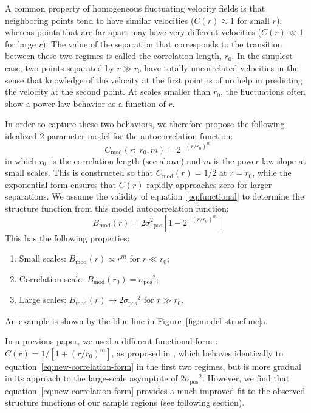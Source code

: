 \documentclass[fleqn,usenatbib, useAMS, a4paper]{mnras}
\newcommand\pos{\ensuremath{_{\mathrm{pos}}}}
\newcommand\model{\ensuremath{_{\mathrm{mod}}}}
\begin{document}
A common property of homogeneous fluctuating velocity fields is that neighboring points tend to have similar velocities
(\(C(r) \approx 1\) for small \(r\)),
whereas points that are far apart may have very different velocities
(\(C(r) \ll 1\) for large \(r\)).
The value of the separation that corresponds to
the transition between these two regimes
is called the correlation length, \(r_0\).
In the simplest case,
two points separated by \(r \gg r_0\) have totally uncorrelated velocities
in the sense that knowledge of the velocity at the first point is of
no help in predicting the velocity at the second point.
At scales smaller than \(r_0\), the fluctuations often show a power-law behavior
as a function of \(r\).

In order to capture these two behaviors,
we therefore propose the following idealized 2-parameter model
for the autocorrelation function:
%
\begin{equation}\label{eq:new-correlation-form}
  C\model(r;\ r_0, m) = 2^{- \left( r/r_0 \right)^m} 
\end{equation}
%
in which \(r_{0}\)\ is the correlation length (see above)
and \(m\) is the power-law slope at small scales.
This is constructed so that \(C\model(r) = 1/2\) at \(r = r_0\),
while the exponential form ensures that \(C(r)\) rapidly approaches zero
for larger separations.
We assume the validity of equation~\eqref{eq:functional} to determine the structure function
from this model autocorrelation function:
\begin{equation}
  \label{eq:model-strucfunc-ideal}
  B\model(r) = 2\sigma^2\pos \left[
    1 - 2^{- \left( r/r_0 \right)^m} 
  \right]
\end{equation}
This has the following properties:
\begin{enumerate}[1.]
 \item Small scales: \(B\model(r) \propto r^m\) for \(r \ll r_0\);
 \item Correlation scale: \(B\model(r_0) = \sigma\pos^2\);
 \item Large scales: \(B\model(r) \to 2 \sigma\pos^2\) for \(r \gg r_0\).
 \end{enumerate}
An example is shown by the blue line in Figure~\ref{fig:model-strucfunc}a.
 
In a previous paper, we used a different functional form
\citetext{See Fig.~13 of \citealp{arthur2016turbulence}}:
\(C(r) = 1/[1+(r/r_{0})^{m}]\), as proposed in \citet{1984ApJ...277..556S},
which behaves identically to equation~\eqref{eq:new-correlation-form}
in the first two regimes, but is more gradual in its approach
to the large-scale asymptote of \(2 \sigma\pos^2\).
However, we find that equation~\eqref{eq:new-correlation-form}
provides a much improved fit to the observed structure functions
of our sample regions (see following section). 
\end{document}
